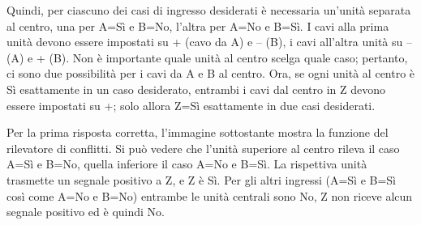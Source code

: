 {{Quindi, per ciascuno dei casi di ingresso desiderati è necessaria un’unità separata al centro, una per A=Sì e B=No, l’altra per A=No e B=Sì. I cavi alla prima unità devono essere impostati su + (cavo da A) e – (B), i cavi all’altra unità su – (A) e + (B).  Non è importante quale unità al centro scelga quale caso; pertanto, ci sono due possibilità per i cavi da A e B al centro.  Ora, se ogni unità al centro è Sì esattamente in un caso desiderato, entrambi i cavi dal centro in Z devono essere impostati su +; solo allora Z=Sì esattamente in due casi desiderati.

Per la prima risposta corretta, l’immagine sottostante mostra la funzione del rilevatore di conflitti. Si può vedere che l’unità superiore al centro rileva il caso A=Sì e B=No, quella inferiore il caso A=No e B=Sì. La rispettiva unità trasmette un segnale positivo a Z, e Z è Sì. Per gli altri ingressi (A=Sì e B=Sì così come A=No e B=No) entrambe le unità centrali sono No, Z non riceve alcun segnale positivo ed è quindi No.

{\centering%
\raisebox{-0.5ex}{} \raisebox{-0.5ex}{}

\raisebox{-0.5ex}{} \raisebox{-0.5ex}{}\par}



}}
